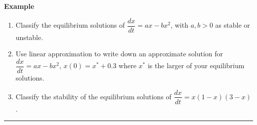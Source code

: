 \documentclass[12pt,letterpaper,noanswers]{exam}
\begin{document}
     \noindent\textbf{Example}
     \begin{enumerate}
     \item Classify the equilibrium solutions of $\dfrac{dx}{dt} = ax - bx^2$, with $a,b>0$ as stable or unstable.
     \vspace{1.5in}
     
     \item Use linear approximation to write down an approximate solution for $\dfrac{dx}{dt} = ax - bx^2$, $x(0) = x^* + 0.3$ where $x^*$ is the larger of your equilibrium solutions.
     \vspace{1.5in}
     
     \item Classify the stability of the equilibrium solutions of $\dfrac{dx}{dt} = x(1-x)(3-x)$.
     
     \end{enumerate}
     
    
    \vspace{0.2cm}
\hrule
\vspace{0.2cm}




    
    
\end{document}
